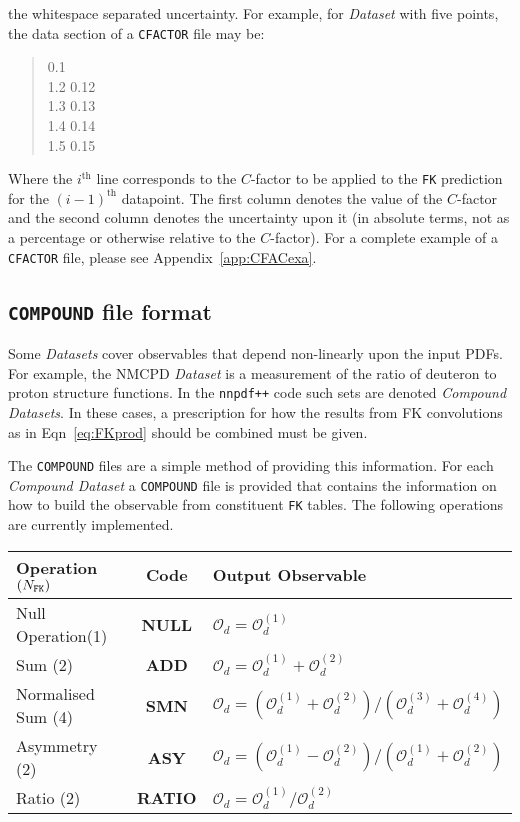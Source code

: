 \documentclass[11pt]{article}
\begin{document}
the whitespace separated uncertainty. For example, for \emph{Dataset} with five
points, the data section of a {\tt CFACTOR} file may be:
%
\begin{quotation}	0.1\\
 1.2	0.12\\
 1.3	0.13\\
 1.4	0.14\\
 1.5	0.15
\end{quotation}
Where the $i^{\text{th}}$ line corresponds to the $C$-factor to be applied to
the {\tt FK} prediction for the $(i-1)^{\text{th}}$ datapoint.  The first column
denotes the value of the $C$-factor and the second column denotes the
uncertainty upon it (in absolute terms, not as a percentage or otherwise
relative to the $C$-factor). For a complete example of a {\tt CFACTOR} file,
please see Appendix~\ref{app:CFACexa}.

\subsection{{\tt COMPOUND} file format}
Some \emph{Datasets} cover observables that depend non-linearly upon the input
PDFs. For example, the NMCPD \emph{Dataset} is a measurement of the ratio of
deuteron to proton structure functions. In the {\tt nnpdf++} code such sets are
denoted \emph{Compound Datasets}. In these cases, a prescription for how the
results from FK convolutions as in Eqn~\ref{eq:FKprod} should be combined must
be given.

The {\tt COMPOUND} files are a simple method of providing this information. For
each \emph{Compound Dataset} a {\tt COMPOUND} file is provided that contains the
information on how to build the observable from constituent {\tt FK} tables. The
following operations are currently implemented.
%
\begin{table}[htp]
\begin{center}
\begin{tabular}{|l|c|l|}
\hline
Operation $(N_{\text{\tt FK}})$ & Code & Output Observable\\
\hline\hline
Null Operation(1)   & \textbf{NULL}  & $\mathcal{O}_d = \mathcal{O}_d^{(1)}$ \\
Sum (2)             & \textbf{ADD}   & $\mathcal{O}_d = \mathcal{O}^{(1)}_d + \mathcal{O}^{(2)}_d $\\
Normalised Sum (4)  & \textbf{SMN}   & $\mathcal{O}_d = (\mathcal{O}^{(1)}_d + \mathcal{O}^{(2)}_d)/(\mathcal{O}^{(3)}_d + \mathcal{O}^{(4)}_d) $ \\
Asymmetry (2)       & \textbf{ASY}   & $\mathcal{O}_d = (\mathcal{O}^{(1)}_d - \mathcal{O}^{(2)}_d)/(\mathcal{O}^{(1)}_d + \mathcal{O}^{(2)}_d) $\\
Ratio (2)           & \textbf{RATIO} & $\mathcal{O}_d = \mathcal{O}^{(1)}_d / \mathcal{O}^{(2)}_d $\\
\hline
\end{tabular}
\end{center}
\label{default}
\end{table}%
\end{document}
